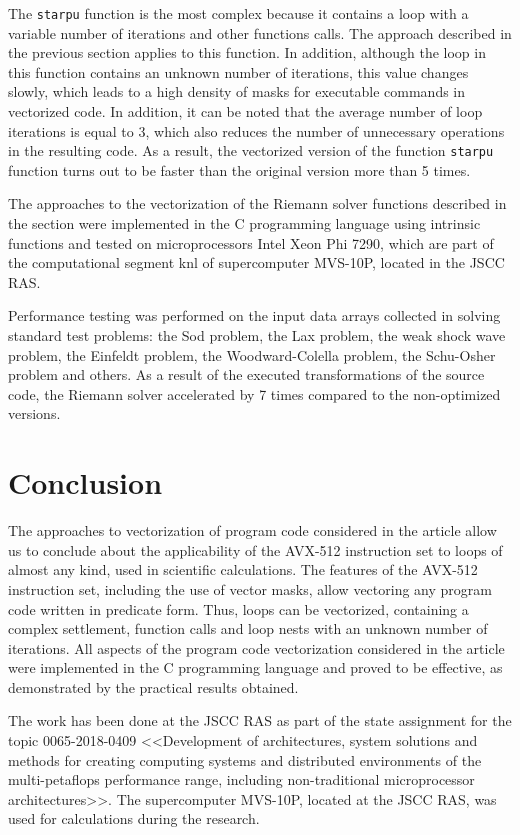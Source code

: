 \documentclass[
11pt,%
tightenlines,%
twoside,%
onecolumn,%
nofloats,%
nobibnotes,%
nofootinbib,%
superscriptaddress,%
noshowpacs,%
centertags]%
{revtex4}
\begin{document}
The \texttt{starpu} function is the most complex because it contains a loop with a variable number of iterations and other functions calls.
The approach described in the previous section applies to this function.
In addition, although the loop in this function contains an unknown number of iterations, this value changes slowly, which leads to a high density of masks for executable commands in vectorized code.
In addition, it can be noted that the average number of loop iterations is equal to 3, which also reduces the number of unnecessary operations in the resulting code.
As a result, the vectorized version of the function \texttt{starpu} function turns out to be faster than the original version more than 5 times.

The approaches to the vectorization of the Riemann solver functions described in the section were implemented in the C programming language using intrinsic functions and tested on microprocessors Intel Xeon Phi 7290, which are part of the computational segment knl of supercomputer MVS-10P, located in the JSCC RAS.

Performance testing was performed on the input data arrays collected in solving standard test problems: the Sod problem, the Lax problem, the weak shock wave problem, the Einfeldt problem, the Woodward-Colella problem, the Schu-Osher problem and others.
As a result of the executed transformations of the source code, the Riemann solver accelerated by 7 times compared to the non-optimized versions.

\section{Conclusion}

The approaches to vectorization of program code considered in the article allow us to conclude about the applicability of the AVX-512 instruction set to loops of almost any kind, used in scientific calculations.
The features of the AVX-512 instruction set, including the use of vector masks, allow vectoring any program code written in predicate form.
Thus, loops can be vectorized, containing a complex settlement, function calls and loop nests with an unknown number of iterations.
All aspects of the program code vectorization considered in the article were implemented in the C programming language and proved to be effective, as demonstrated by the practical results obtained.

\begin{acknowledgments}
The work has been done at the JSCC RAS as part of the state assignment for the topic 0065-2018-0409 <<Development of architectures, system solutions and methods for creating computing systems and distributed environments of the multi-petaflops performance range, including non-traditional microprocessor architectures>>. The supercomputer MVS-10P, located at the JSCC RAS, was used for calculations during the research.
\end{acknowledgments}
\end{document}
